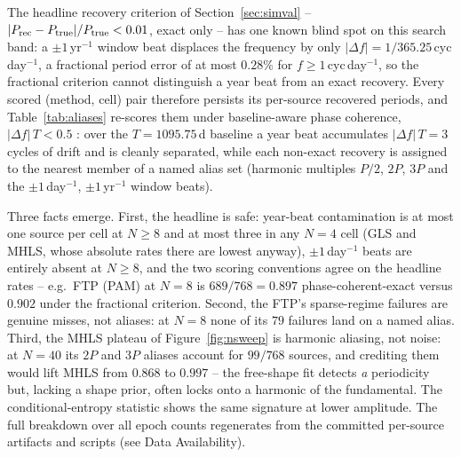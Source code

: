 \documentclass[apj]{emulateapj}
\begin{document}
\begin{appendix}
The headline recovery criterion of Section~\ref{sec:simval} --
$|P_{\rm rec}-P_{\rm true}|/P_{\rm true} < 0.01$, exact only -- has one
known blind spot on this search band: a $\pm1$\,yr$^{-1}$ window beat
displaces the frequency by only $|\Delta f| = 1/365.25$\,cyc\,day$^{-1}$,
a fractional period error of at most $0.28\%$ for $f \geq
1$\,cyc\,day$^{-1}$, so the fractional criterion cannot distinguish a
year beat from an exact recovery.  Every scored (method, cell) pair
therefore persists its per-source recovered periods, and
Table~\ref{tab:aliases} re-scores them under baseline-aware phase
coherence, $|\Delta f|\,T < 0.5$ \citep[the accumulated-phase-drift
convention of][]{Graham_etal_2013}: over the $T = 1095.75$\,d baseline a
year beat accumulates $|\Delta f|\,T = 3$ cycles of drift and is cleanly
separated, while each non-exact recovery is assigned to the nearest
member of a named alias set (harmonic multiples $P/2$, $2P$, $3P$ and
the $\pm1$\,day$^{-1}$, $\pm1$\,yr$^{-1}$ window beats).

Three facts emerge.  First, the headline is safe: year-beat
contamination is at most one source per cell at $N \geq 8$ and at most
three in any $N = 4$ cell (GLS and MHLS, whose absolute rates there are
lowest anyway), $\pm1$\,day$^{-1}$ beats are entirely absent at
$N \geq 8$, and the two scoring
conventions agree on the headline rates -- e.g.\ FTP (PAM) at $N = 8$
is $689/768 = 0.897$ phase-coherent-exact versus $0.902$ under the
fractional criterion.  Second, the FTP's sparse-regime failures are
genuine misses, not aliases: at $N = 8$ none of its $79$ failures land
on a named alias.  Third, the MHLS plateau of
Figure~\ref{fig:nsweep} is harmonic aliasing, not noise: at $N = 40$
its $2P$ and $3P$ aliases account for $99/768$ sources, and crediting
them would lift MHLS from $0.868$ to $0.997$ -- the free-shape fit
detects \emph{a} periodicity but, lacking a shape prior, often locks
onto a harmonic of the fundamental.  The conditional-entropy statistic
shows the same signature at lower amplitude.  The full breakdown over
all epoch counts regenerates from the committed per-source artifacts
and scripts (see Data Availability).


\end{appendix}
\end{document}
